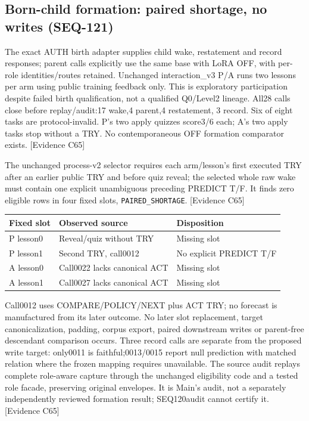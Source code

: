 \documentclass[11pt]{article}
\newcommand{\ev}[1]{\textsf{[Evidence #1]}}
\begin{document}
\subsection{Born-child formation: paired shortage, no writes (SEQ-121)}
The exact AUTH birth adapter supplies child wake, restatement and record
responses; parent calls explicitly use the same base with LoRA OFF, with
per-role identities/routes retained. Unchanged interaction\_v3 P/A runs two
lessons per arm using public training feedback only. This is exploratory
participation despite failed birth qualification, not a qualified Q0/Level2
lineage. All28 calls close before replay/audit:17 wake,4 parent,4 restatement,
3 record. Six of eight tasks are protocol-invalid. P's two apply quizzes
score3/6 each; A's two apply tasks stop without a TRY. No contemporaneous
OFF formation comparator exists. \ev{C65}

The unchanged process-v2 selector requires each arm/lesson's first executed
TRY after an earlier public TRY and before quiz reveal; the selected whole
raw wake must contain one explicit unambiguous preceding PREDICT T/F. It finds
zero eligible rows in four fixed slots, \texttt{PAIRED\_SHORTAGE}. \ev{C65}

\begin{center}\small
\begin{tabular}{lll}
\toprule
Fixed slot & Observed source & Disposition \\
\midrule
P lesson0 & Reveal/quiz without TRY & Missing slot \\
P lesson1 & Second TRY, call0012 & No explicit PREDICT T/F \\
A lesson0 & Call0022 lacks canonical ACT & Missing slot \\
A lesson1 & Call0027 lacks canonical ACT & Missing slot \\
\bottomrule
\end{tabular}
\end{center}

Call0012 uses COMPARE/POLICY/NEXT plus ACT TRY; no forecast is manufactured
from its later outcome. No later slot replacement, target canonicalization,
padding, corpus export, paired downstream writes or parent-free descendant
comparison occurs. Three record calls are separate from the proposed write
target: only0011 is faithful;0013/0015 report null prediction with matched
relation where the frozen mapping requires unavailable. The source audit
replays complete role-aware capture through the unchanged eligibility code
and a tested role facade, preserving original envelopes. It is Main's audit,
not a separately independently reviewed formation result; SEQ120audit cannot
certify it. \ev{C65}
\end{document}

